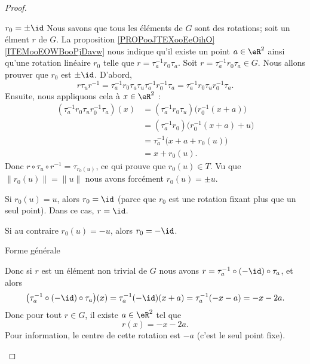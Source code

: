 \begin{proof}
\begin{subproof}
            \begin{subproof}
                \item[\( r_0=\pm\id\)]
                    Nous savons que tous les éléments de \( G\) sont des rotations; soit un élment \( r\) de \( G\). La proposition \ref{PROPooJTEXooEeOihO}\ref{ITEMooEOWBooPjDavw} nous indique qu'il existe un point \( a\in \eR^2\) ainsi qu'une rotation linéaire \( r_0\) telle que \( r=\tau_a^{-1}r_0\tau_a\). Soit \( r=\tau_{a}^{-1}r_0\tau_a\in G \). Nous allons prouver que \( r_0\) est \( \pm\id\). D'abord,
                    \begin{equation}
                        r\tau_u r^{-1}=\tau_a^{-1}r_0\tau_a\tau_u\tau_a^{-1}r_0^{-1}\tau_a=\tau_a^{-1}r_0\tau_ur_0^{-1}\tau_a.
                    \end{equation}
                    Ensuite, nous appliquons cela à \( x\in \eR^2\) :
                    \begin{subequations}
                        \begin{align}
                            (\tau_a^{-1}r_0\tau_ur_0^{-1}\tau_a)(x)&=(\tau_a^{-1}r_0\tau_u)\big( r_0^{-1}(x+a) \big)\\
                            &=(\tau_a^{-1}r_0)\big( r_0^{-1}(x+a)+u \big)\\
                            &=\tau_a^{-1}\big( x+a+r_0(u) \big)\\
                            &=x+r_0(u).
                        \end{align}
                    \end{subequations}
                    Donc \( r\circ\tau_u\circ r^{-1}=\tau_{r_0(u)}\), ce qui prouve que \( r_0(u)\in T\). Vu que \( \| r_0(u) \|=\| u \|\) nous avons forcément \( r_0(u)=\pm u\).

                    Si \( r_0(u)=u\), alors \( r_0=\id\) (parce que \( r_0\) est une rotation fixant plus que un seul point). Dans ce cas, \( r=\id\).

                    Si au contraire \( r_0(u)=-u\), alors \( r_0=-\id\).

                \item[Forme générale]

                    Donc si \( r\) est un élément non trivial de \( G\) nous avons \( r=\tau_a^{-1}\circ(-\id)\circ\tau_a\), et alors
                    \begin{equation}
                        \big( \tau_a^{-1}\circ(-\id)\circ\tau_a \big)(x)=\tau_a^{-1}  (-\id)(x+a)=\tau_a^{-1}(-x-a)=-x-2a.
                    \end{equation}
                    Donc pour tout \( r\in G\), il existe \( a\in \eR^2\) tel que
                    \begin{equation}        \label{EQooQGNVooKyCCYW}
                        r(x)=-x-2a.
                    \end{equation}
                    Pour information, le centre de cette rotation est \( -a\) (c'est le seul point fixe).


\end{subproof}
\end{subproof}
\end{proof}
